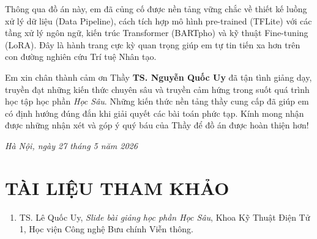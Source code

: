 Thông qua đồ án này, em đã củng cố được nền tảng vững chắc về thiết kế luồng xử lý dữ liệu (Data Pipeline), cách tích hợp mô hình pre-trained (TFLite) với các tầng xử lý ngôn ngữ, kiến trúc Transformer (BARTpho) và kỹ thuật Fine-tuning (LoRA). Đây là hành trang cực kỳ quan trọng giúp em tự tin tiến xa hơn trên con đường nghiên cứu Trí tuệ Nhân tạo.

Em xin chân thành cảm ơn Thầy \textbf{TS. Nguyễn Quốc Uy} đã tận tình giảng dạy, truyền đạt những kiến thức chuyên sâu và truyền cảm hứng trong suốt quá trình học tập học phần \textit{Học Sâu}. Những kiến thức nền tảng thầy cung cấp đã giúp em có định hướng đúng đắn khi giải quyết các bài toán phức tạp. Kính mong nhận được những nhận xét và góp ý quý báu của Thầy để đồ án được hoàn thiện hơn!

\vspace{1cm}
\begin{flushright}
    \textit{Hà Nội, ngày 27 tháng 5 năm 2026}
\end{flushright}

\newpage

\newpage

\section*{TÀI LIỆU THAM KHẢO}

\begin{enumerate}
    \item TS. Lê Quốc Uy, \textit{Slide bài giảng học phần Học Sâu}, Khoa Kỹ Thuật Điện Tử 1, Học viện Công nghệ Bưu chính Viễn thông.




\end{enumerate}

